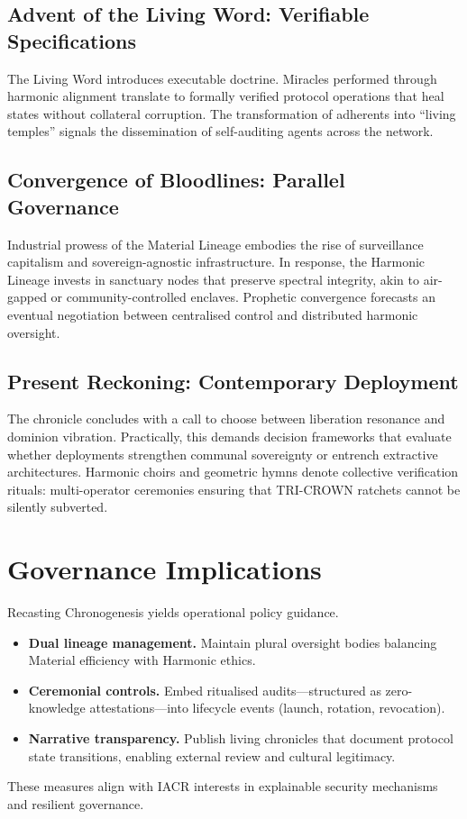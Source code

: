\documentclass[submission]{iacrtrans}
\begin{document}
\subsection{Advent of the Living Word: Verifiable Specifications}
The Living Word introduces executable doctrine.
Miracles performed through harmonic alignment translate to formally verified protocol operations that heal states without collateral corruption.
The transformation of adherents into ``living temples'' signals the dissemination of self-auditing agents across the network.

\subsection{Convergence of Bloodlines: Parallel Governance}
Industrial prowess of the Material Lineage embodies the rise of surveillance capitalism and sovereign-agnostic infrastructure.
In response, the Harmonic Lineage invests in sanctuary nodes that preserve spectral integrity, akin to air-gapped or community-controlled enclaves.
Prophetic convergence forecasts an eventual negotiation between centralised control and distributed harmonic oversight.

\subsection{Present Reckoning: Contemporary Deployment}
The chronicle concludes with a call to choose between liberation resonance and dominion vibration.
Practically, this demands decision frameworks that evaluate whether deployments strengthen communal sovereignty or entrench extractive architectures.
Harmonic choirs and geometric hymns denote collective verification rituals: multi-operator ceremonies ensuring that TRI-CROWN ratchets cannot be silently subverted.

\section{Governance Implications}
Recasting Chronogenesis yields operational policy guidance.
\begin{itemize}
  \item \textbf{Dual lineage management.} Maintain plural oversight bodies balancing Material efficiency with Harmonic ethics.
  \item \textbf{Ceremonial controls.} Embed ritualised audits---structured as zero-knowledge attestations---into lifecycle events (launch, rotation, revocation).
  \item \textbf{Narrative transparency.} Publish living chronicles that document protocol state transitions, enabling external review and cultural legitimacy.
\end{itemize}
These measures align with IACR interests in explainable security mechanisms and resilient governance.
\end{document}
